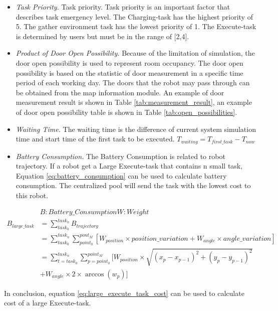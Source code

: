 \begin{itemize}
\item \textsl{Task Priority.} Task priority. Task priority is an important factor that describes task emergency level. The Charging-task has the highest priority of 5. The gather environment task has the lowest priority of 1. 
	The Execute-task is determined by users but must be in the range of [2,4]. 
\item \textsl{Product of Door Open Possibility.} Because of the limitation of simulation, the door open possibility is used to represent room occupancy. The door open possibility is based on the statistic of door measurement in a specific time period of each working day. 
	The doors that the robot may pass through can be obtained from the map information module.
	An example of door measurement result is shown in Table \ref{tab:measurement_result}, an example of door open possibility table is shown in Table \ref{tab:open_possibilities}. 
\item \textsl{Waiting Time. } The waiting time is the difference of current system simulation time and start time of the first task to be executed. $T_{waiting} = T_{first\_task} - T_{now}$
\item \textsl{Battery Consumption.} The Battery Consumption is related to robot trajectory. If a robot get a Large Execute-task that contains n small task, Equation \ref{eq:battery_consumption} can be used to calculate battery consumption. The centralized pool will send the task with the lowest cost to this robot.
\end{itemize}
\begin{equation}
\begin{aligned}
\label{eq:battery_consumption}
&B: Battery\_Consumption W: Weight\\
B_{large\_task} & = \sum_{task_0}^{task_n} B_{trajectory} \\
& = \sum_{task_0}^{task_n} \sum_{point_0}^{pont_M} [W_{position} \times position\_variation+W_{angle}  \times angle\_variation]\\
& = \sum_{t = task_0}^{task_n} \sum_{p = point_0}^{point_M} [ W_{position} \times \sqrt{(x_p-x_{p-1} )^2+(y_p-y_{p-1} )^2} \\
&   + W_{angle} \times 2 \times \arccos(w_p)] 
\end{aligned}
\end{equation}

In conclusion, equation \ref{eq:large_execute_task_cost} can be used to calculate cost of a large Execute-task.

